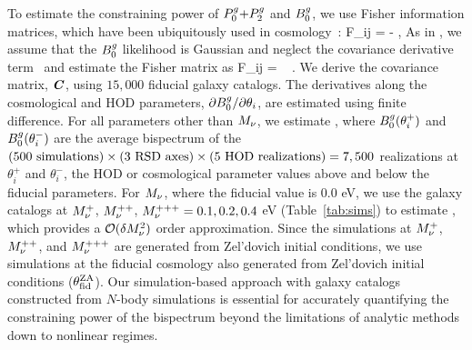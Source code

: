 To estimate the constraining power of $P^g_0{+}P^g_2$ and $B^g_0$, we use Fisher information
matrices, which have been ubiquitously used in
cosmology~\citep[\emph{e.g.}][]{jungman1996,tegmark1997,dodelson2003,heavens2009,verde2010}: 
\beq 
F_{ij} = - \bigg \langle {} \bigg \rangle,
\eeq
As in \cite{hahn2020}, we assume that the $B^g_0$ likelihood is Gaussian and
neglect the covariance derivative term~\citep{carron2013} and estimate the
Fisher matrix as 
\beq \label{eq:fisher}
F_{ij} = ~ .
\eeq
We derive the covariance matrix, $\textbf{\textit{C}}$, using $15,000$ fiducial galaxy
catalogs. The derivatives along the cosmological and HOD
parameters, $\partial B^g_0/\partial \theta_i$, are estimated using finite
difference. For all parameters other than $M_\nu$, we estimate 
\beq 
{} \approx {}, 
\eeq
where $B^g_0(\theta_i^{+})$ and $B^g_0(\theta_i^{-})$ are the average bispectrum of the 
$(500~{\rm simulations})\times(3~{\rm RSD~axes})\times(5~{\rm
HOD~realizations}) = 7,500$
realizations at $\theta_i^{+}$ and $\theta_i^{-}$, the HOD or 
cosmological parameter values above and below the fiducial parameters.  
For $M_\nu$, where the fiducial value is 0.0 eV, we use the galaxy catalogs 
at $M_\nu^+$, $M_\nu^{++}$, $M_\nu^{+++}=0.1, 0.2, 0.4$ eV (Table~\ref{tab:sims}) 
to estimate 
\beq \label{eq:dbkdmnu} 
\frac{\partial \Bg}{\partial \smnu} \approx {}, 
\eeq
which provides a $\mathcal{O}(\delta M_\nu^2)$ order approximation. 
Since the simulations at $M_\nu^+$, $M_\nu^{++}$, and $M_\nu^{+++}$ are generated 
from Zel'dovich initial conditions, we use simulations at the fiducial cosmology 
also generated from Zel'dovich initial conditions ($\theta_{\rm fid}^{\rm ZA}$). 
Our simulation-based approach with galaxy catalogs constructed from
$N$-body simulations is essential for accurately quantifying the constraining power
of the bispectrum beyond the limitations of analytic methods down to nonlinear
regimes.
